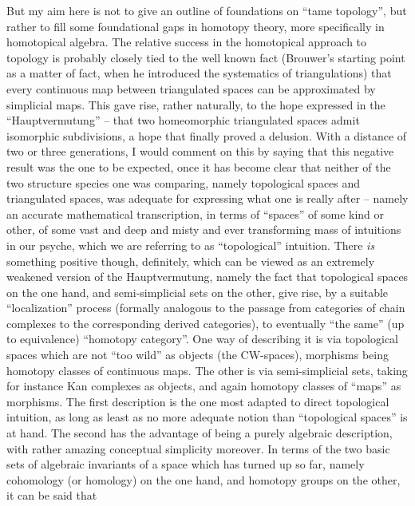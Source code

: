 \label{sec:15}%
But my aim here is not to give an outline of foundations on ``tame
topology'', but rather to fill some foundational gaps in homotopy
theory, more specifically in homotopical algebra. The relative success
in the homotopical approach to topology is probably closely tied to
the well known fact (Brouwer's starting point as a matter of fact,
when he introduced the systematics of triangulations) that every
continuous map between triangulated spaces can be approximated by
simplicial maps. This gave rise, rather naturally, to the hope
expressed in the ``Hauptvermutung'' -- that two homeomorphic
triangulated spaces admit isomorphic subdivisions, a hope that finally
proved a delusion. With a distance of two or three generations, I
would comment on this by saying that this negative result was the one
to be expected, once it has become clear that neither of the two
structure species one was comparing, namely topological spaces and
triangulated spaces, was adequate for expressing what one is really
after -- namely an accurate mathematical transcription, in terms of
``spaces'' of some kind or other, of some vast and deep and misty and
ever transforming mass of intuitions in our psyche, which we are
referring to as ``topological'' intuition. There \emph{is} something
positive though, definitely, which can be viewed as an extremely
weakened version of the Hauptvermutung, namely the fact that
topological spaces on the one hand, and semi-simplicial sets on the
other, give rise, by a suitable ``localization'' process
(formally analogous to the passage from categories of chain complexes
to the corresponding derived categories), to
eventually  ``the same'' (up to equivalence)
``homotopy category''. One way of describing it is via topological
spaces which are not ``too wild'' as objects (the CW-spaces),
morphisms being homotopy classes of continuous maps. The other is via
semi-simplicial sets, taking for instance Kan complexes as objects,
and again homotopy classes of ``maps'' as morphisms. The first
description is the one most adapted to direct topological intuition,
as long as least as no more adequate notion than ``topological
spaces'' is at hand. The second has the advantage of being a purely
algebraic description, with rather amazing conceptual simplicity
moreover. In terms of the two basic sets of algebraic invariants of a
space which has turned up so far, namely cohomology (or homology) on
the one hand, and homotopy groups on the other, it can be said that
